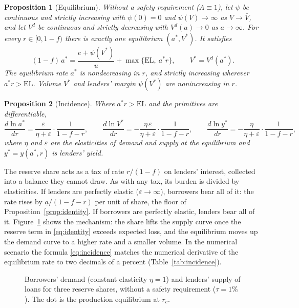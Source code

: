 \documentclass[preprint,11pt,authoryear]{elsarticle}
\newtheorem{proposition}{Proposition}
\theoremstyle{definition}
\newcommand{\EL}{\mathrm{EL}}
\begin{document}
\begin{proposition}[Equilibrium]\label{prop:eq}
Without a safety requirement ($A\equiv1$), let $\psi$ be continuous and strictly increasing with $\psi(0)=0$
and $\psi(V)\to\infty$ as $V\to\bar V$, and let $V^d$ be continuous and strictly decreasing with $V^d(a)\to0$
as $a\to\infty$. For every
$r\in[0,1-f)$ there is exactly one equilibrium $(a^*,V^*)$. It satisfies
\begin{equation}\label{eq:eqrate}
  (1-f)\,a^*=\frac{e+\psi(V^*)}{u}+\max\{\EL,\ a^*r\},\qquad V^*=V^d(a^*).
\end{equation}
The equilibrium rate $a^*$ is nondecreasing in $r$, and strictly increasing wherever $a^*r>\EL$. Volume
$V^*$ and lenders' margin $\psi(V^*)$ are nonincreasing in $r$.
\end{proposition}

\begin{proposition}[Incidence]\label{prop:incidence}
Where $a^*r>\EL$ and the primitives are differentiable,
\begin{equation}\label{eq:incidence}
  \frac{d\ln a^*}{dr}=\frac{\varepsilon}{\eta+\varepsilon}\cdot\frac1{1-f-r},\qquad
  \frac{d\ln V^*}{dr}=-\frac{\eta\,\varepsilon}{\eta+\varepsilon}\cdot\frac1{1-f-r},\qquad
  \frac{d\ln y^*}{dr}=-\frac{\eta}{\eta+\varepsilon}\cdot\frac1{1-f-r},
\end{equation}
where $\eta$ and $\varepsilon$ are the elasticities of demand and supply at the equilibrium and $y^*=y(a^*,r)$
is lenders' yield.
\end{proposition}

The reserve share acts as a tax of rate $r/(1-f)$ on lenders' interest, collected into a balance they cannot
draw. As with any tax, its burden is divided by elasticities. If lenders are perfectly elastic ($\varepsilon\to\infty$),
borrowers bear all of it: the rate rises by $\underline a/(1-f-r)$ per unit of share, the floor of
Proposition~\ref{prop:identity}. If borrowers are perfectly elastic, lenders bear all of it. Figure~\ref{fig:market} shows the
mechanism: the share lifts the supply curve once the reserve term in \eqref{eq:identity} exceeds expected loss, and the
equilibrium moves up the demand curve to a higher rate and a smaller volume. In the numerical scenario the formula
\eqref{eq:incidence} matches the numerical derivative of the equilibrium rate to two decimals of a percent
(Table~\ref{tab:incidence}).

\begin{figure}[ht]
  \centering
  
  \caption{Borrowers' demand (constant elasticity $\eta=1$) and lenders' supply of loans for three reserve shares,
  without a safety requirement ($\tau=1\%$). The dot is the production equilibrium at $r_c$.}
  \label{fig:market}
\end{figure}
\end{document}
